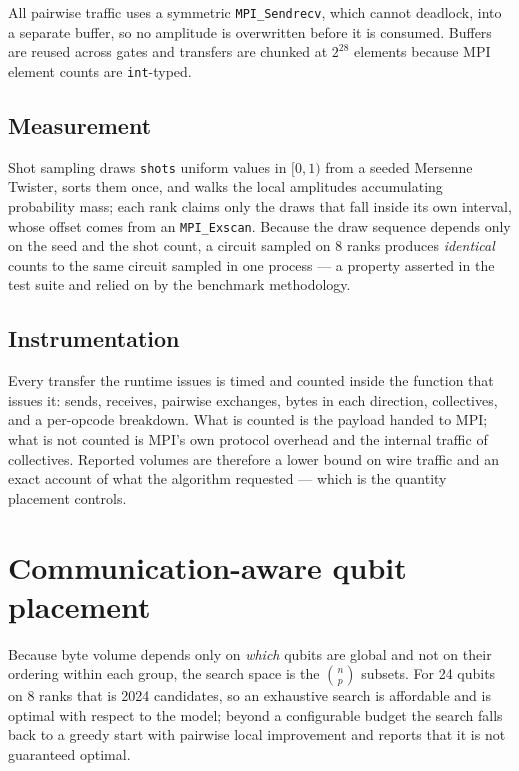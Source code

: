 \documentclass[11pt]{article}
\begin{document}
All pairwise traffic uses a symmetric \texttt{MPI\_Sendrecv}, which cannot
deadlock, into a separate buffer, so no amplitude is overwritten before it is
consumed. Buffers are reused across gates and transfers are chunked at $2^{28}$
elements because MPI element counts are \texttt{int}-typed.

\subsection{Measurement}

Shot sampling draws \texttt{shots} uniform values in $[0, 1)$ from a seeded
Mersenne Twister, sorts them once, and walks the local amplitudes accumulating
probability mass; each rank claims only the draws that fall inside its own
interval, whose offset comes from an \texttt{MPI\_Exscan}. Because the draw
sequence depends only on the seed and the shot count, a circuit sampled on 8
ranks produces \emph{identical} counts to the same circuit sampled in one
process --- a property asserted in the test suite and relied on by the
benchmark methodology.

\subsection{Instrumentation}

Every transfer the runtime issues is timed and counted inside the function that
issues it: sends, receives, pairwise exchanges, bytes in each direction,
collectives, and a per-opcode breakdown. What is counted is the payload handed
to MPI; what is not counted is MPI's own protocol overhead and the internal
traffic of collectives. Reported volumes are therefore a lower bound on wire
traffic and an exact account of what the algorithm requested --- which is the
quantity placement controls.

\section{Communication-aware qubit placement}

Because byte volume depends only on \emph{which} qubits are global and not on
their ordering within each group, the search space is the $\binom{n}{p}$
subsets. For 24 qubits on 8 ranks that is 2024 candidates, so an exhaustive
search is affordable and is optimal with respect to the model; beyond a
configurable budget the search falls back to a greedy start with pairwise local
improvement and reports that it is not guaranteed optimal.
\end{document}
